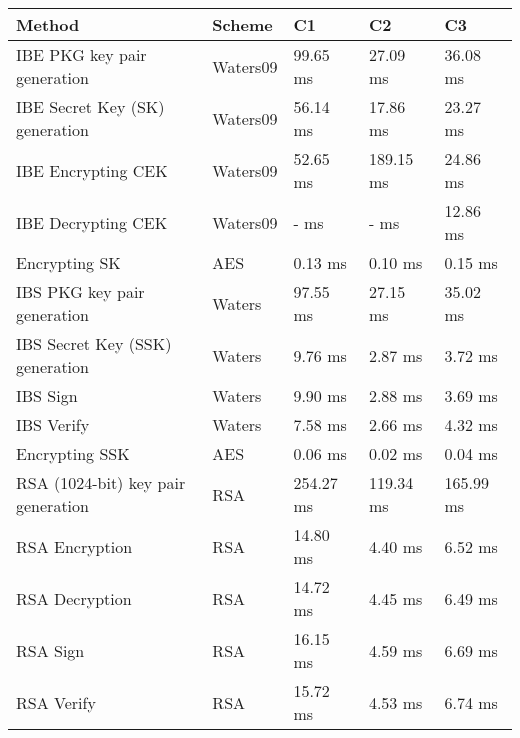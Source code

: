 \begin{table}[h]
  \begin{tabular}[c]{lllll}
  Method                                      & Scheme          & C1              & C2          & C3              \\ \hline
  IBE PKG key pair generation                 & Waters09        & 99.65 ms        & 27.09 ms    & 36.08 ms     \\ %
  IBE Secret Key (SK) generation              & Waters09        & 56.14 ms        & 17.86 ms    & 23.27 ms     \\ %
  IBE Encrypting CEK                          & Waters09        & 52.65 ms        & 189.15 ms   & 24.86 ms     \\ %
  IBE Decrypting CEK                          & Waters09        & - ms            & - ms        & 12.86 ms      \\ %
  Encrypting SK                               & AES             & 0.13 ms         & 0.10 ms     & 0.15 ms     \\ %
  IBS PKG key pair generation                 & Waters          & 97.55 ms        & 27.15 ms    & 35.02 ms     \\ %
  IBS Secret Key (SSK) generation             & Waters          & 9.76 ms         & 2.87 ms     & 3.72 ms     \\ %
  IBS Sign                                    & Waters          & 9.90 ms         & 2.88 ms     & 3.69 ms     \\ %
  IBS Verify                                  & Waters          & 7.58 ms         & 2.66 ms     & 4.32 ms     \\ %
  Encrypting SSK                              & AES             & 0.06 ms         & 0.02 ms     & 0.04 ms     \\ %
  RSA (1024-bit) key pair generation          & RSA             & 254.27 ms       & 119.34 ms   & 165.99 ms     \\ %
  RSA Encryption                              & RSA             & 14.80 ms        & 4.40 ms     & 6.52 ms     \\ %
  RSA Decryption                              & RSA             & 14.72 ms        & 4.45 ms     & 6.49 ms     \\ %
  RSA Sign                                    & RSA             & 16.15 ms        & 4.59 ms     & 6.69 ms     \\ %
  RSA Verify                                  & RSA             & 15.72 ms        & 4.53 ms     & 6.74 ms     \\ %

\end{tabular}
\end{table}

